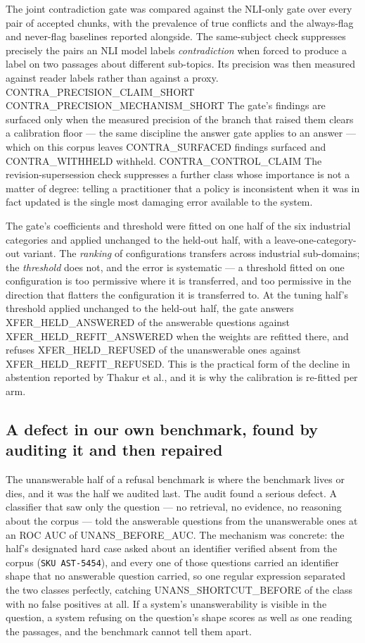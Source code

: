 \documentclass[conference]{IEEEtran}
\begin{document}
The joint contradiction gate was compared against the NLI-only gate over every
pair of accepted chunks, with the prevalence of true conflicts and the
always-flag and never-flag baselines reported alongside. The same-subject check
suppresses precisely the pairs an NLI model labels \emph{contradiction} when
forced to produce a label on two passages about different sub-topics. Its
precision was then measured against reader labels rather than against a proxy.
{{CONTRA_PRECISION_CLAIM_SHORT}} {{CONTRA_PRECISION_MECHANISM_SHORT}} The
gate's findings are surfaced only when the measured precision of the branch
that raised them clears a calibration floor --- the same discipline the answer
gate applies to an answer --- which on this corpus leaves
{{CONTRA_SURFACED}} findings surfaced and {{CONTRA_WITHHELD}} withheld.
{{CONTRA_CONTROL_CLAIM}} The
revision-supersession check suppresses a further class whose importance is not
a matter of degree: telling a practitioner that a policy is inconsistent when
it was in fact updated is the single most damaging error available to the
system.

The gate's coefficients and threshold were fitted on one half of the six
industrial categories and applied unchanged to the held-out half, with a
leave-one-category-out variant. The \emph{ranking} of configurations transfers
across industrial sub-domains; the \emph{threshold} does not, and the error is
systematic --- a threshold fitted on one configuration is too permissive where it
is transferred, and too permissive in the direction that flatters the
configuration it is transferred to. At the tuning half's threshold applied
unchanged to the held-out half, the gate answers
{{XFER_HELD_ANSWERED}} of the answerable questions against
{{XFER_HELD_REFIT_ANSWERED}} when the weights are refitted there, and refuses
{{XFER_HELD_REFUSED}} of the unanswerable ones against
{{XFER_HELD_REFIT_REFUSED}}. This is the practical form of the decline in
abstention reported by Thakur et al., and it is why the calibration is
re-fitted per arm.

\subsection{A defect in our own benchmark, found by auditing it and then
repaired}
\label{sec:unansaudit}

The unanswerable half of a refusal benchmark is where the benchmark lives or
dies, and it was the half we audited last. The audit found a serious defect.
A classifier that saw only the question --- no retrieval, no evidence, no
reasoning about the corpus --- told the answerable questions from the
unanswerable ones at an ROC AUC of {{UNANS_BEFORE_AUC}}. The mechanism was
concrete: the half's designated hard case asked about an identifier verified
absent from the corpus (\texttt{SKU AST-5454}), and every one of those
questions carried an identifier shape that no answerable question carried, so
one regular expression separated the two classes perfectly, catching
{{UNANS_SHORTCUT_BEFORE}} of the class with no false positives at all. If a
system's unanswerability is visible in the question, a system refusing on the
question's shape scores as well as one reading the passages, and the benchmark
cannot tell them apart.
\end{document}
